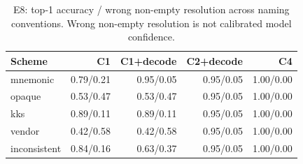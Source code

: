 \begin{table}[t]
\centering\footnotesize
\caption{E8: top-1 accuracy / wrong non-empty resolution across naming conventions. Wrong non-empty resolution is not calibrated model confidence.}
\label{tab:archive-naming}
\setlength{\tabcolsep}{3.5pt}
\begin{tabular}{@{}lrrrr@{}}
\toprule
Scheme & C1 & C1+decode & C2+decode & C4 \\
\midrule
mnemonic & 0.79/0.21 & 0.95/0.05 & 0.95/0.05 & 1.00/0.00 \\
opaque & 0.53/0.47 & 0.53/0.47 & 0.95/0.05 & 1.00/0.00 \\
kks & 0.89/0.11 & 0.89/0.11 & 0.95/0.05 & 1.00/0.00 \\
vendor & 0.42/0.58 & 0.42/0.58 & 0.95/0.05 & 1.00/0.00 \\
inconsistent & 0.84/0.16 & 0.63/0.37 & 0.95/0.05 & 1.00/0.00 \\
\bottomrule
\end{tabular}
\end{table}
